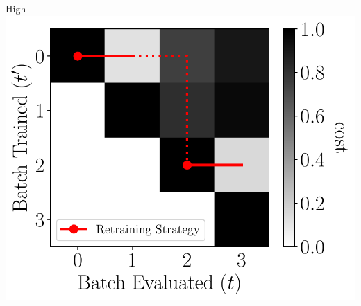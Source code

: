 \documentclass[pdf]{beamer}
\begin{document}
\begin{frame}
\begin{minipage}{0.5\textwidth}
          \begin{center}
              {\footnotesize High \retraincost}\\[1mm]
              \includegraphics[width=\textwidth]{figs/high_retrain_cost.pdf}
          \end{center}
        \end{minipage}%
    

\end{frame}
\end{document}
